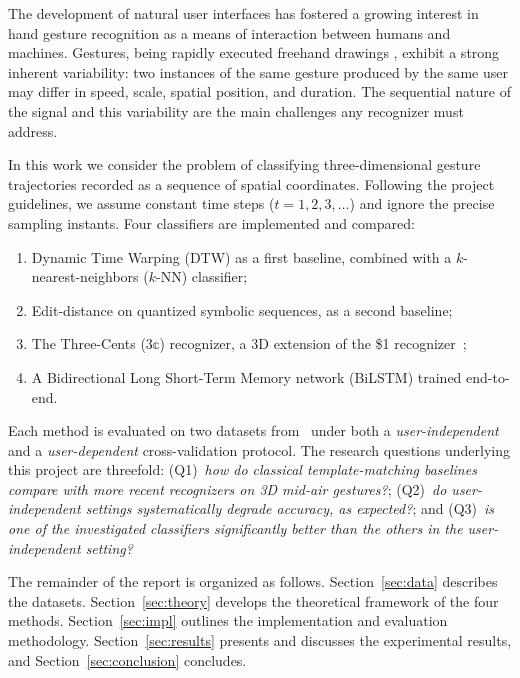 
The development of natural user interfaces has fostered a growing interest in
hand gesture recognition as a means of interaction between humans and machines.
Gestures, being rapidly executed freehand drawings
\cite{Huang2019}, exhibit a strong inherent variability: two instances of the
same gesture produced by the same user may differ in speed, scale, spatial
position, and duration. The sequential nature of the signal and this variability
are the main challenges any recognizer must address.

In this work we consider the problem of classifying three-dimensional gesture
trajectories recorded as a sequence of spatial coordinates. Following the
project guidelines, we assume constant time steps ($t = 1, 2, 3, \dots$) and
ignore the precise sampling instants. Four classifiers are implemented and
compared:
\begin{enumerate}\itemsep 0em
    \item Dynamic Time Warping (DTW) as a first baseline, combined with
    a $k$-nearest-neighbors ($k$-NN) classifier;
    \item Edit-distance on quantized symbolic sequences, as a second
    baseline;
    \item The Three-Cents ($3\mathbb{c}$) recognizer, a 3D extension of the
    \$1 recognizer~\cite{Wobbrock2007};
    \item A Bidirectional Long Short-Term Memory network (BiLSTM) trained end-to-end.
\end{enumerate}

Each method is evaluated on two datasets from~\cite{Huang2019} under both a
\emph{user-independent} and a \emph{user-dependent} cross-validation protocol.
The research questions underlying this project are threefold: (Q1)~\emph{how do
classical template-matching baselines compare with more recent recognizers on
3D mid-air gestures?}; (Q2)~\emph{do user-independent settings systematically
degrade accuracy, as expected?}; and (Q3)~\emph{is one of the investigated
classifiers significantly better than the others in the user-independent
setting?}

The remainder of the report is organized as follows. Section~\ref{sec:data}
describes the datasets. Section~\ref{sec:theory} develops the theoretical
framework of the four methods. Section~\ref{sec:impl} outlines the
implementation and evaluation methodology. Section~\ref{sec:results} presents
and discusses the experimental results, and Section~\ref{sec:conclusion}
concludes.
